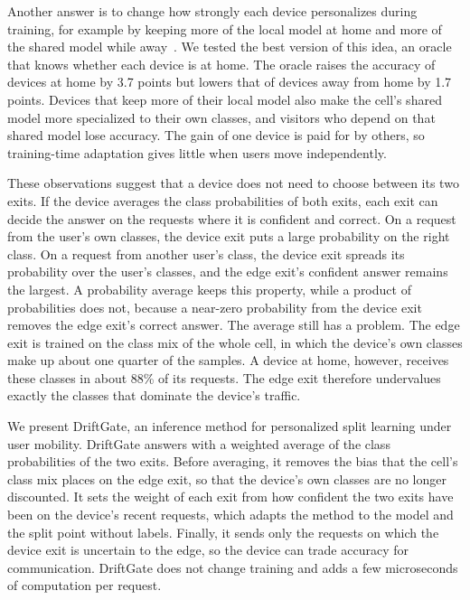Another answer is to change how strongly each device personalizes during training, for example by keeping more of the local model at home and more of the shared model while away~\cite{deng2020apfl}. We tested the best version of this idea, an oracle that knows whether each device is at home. The oracle raises the accuracy of devices at home by 3.7 points but lowers that of devices away from home by 1.7 points. Devices that keep more of their local model also make the cell's shared model more specialized to their own classes, and visitors who depend on that shared model lose accuracy. The gain of one device is paid for by others, so training-time adaptation gives little when users move independently.

These observations suggest that a device does not need to choose between its two exits. If the device averages the class probabilities of both exits, each exit can decide the answer on the requests where it is confident and correct. On a request from the user's own classes, the device exit puts a large probability on the right class. On a request from another user's class, the device exit spreads its probability over the user's classes, and the edge exit's confident answer remains the largest. A probability average keeps this property, while a product of probabilities does not, because a near-zero probability from the device exit removes the edge exit's correct answer. The average still has a problem. The edge exit is trained on the class mix of the whole cell, in which the device's own classes make up about one quarter of the samples. A device at home, however, receives these classes in about 88\% of its requests. The edge exit therefore undervalues exactly the classes that dominate the device's traffic.

We present DriftGate, an inference method for personalized split learning under user mobility. DriftGate answers with a weighted average of the class probabilities of the two exits. Before averaging, it removes the bias that the cell's class mix places on the edge exit, so that the device's own classes are no longer discounted. It sets the weight of each exit from how confident the two exits have been on the device's recent requests, which adapts the method to the model and the split point without labels. Finally, it sends only the requests on which the device exit is uncertain to the edge, so the device can trade accuracy for communication. DriftGate does not change training and adds a few microseconds of computation per request.

